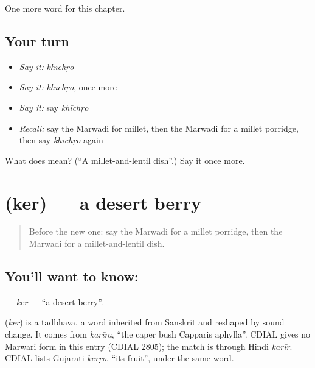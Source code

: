 \begin{grammarlens}[title={What you've built}]
One more word for this chapter.
\end{grammarlens}

\subsection*{Your turn}
\begin{itemize}
\raggedright
  \item \emph{Say it:} \emph{khīchṛo}
  \item \emph{Say it:} \emph{khīchṛo}, once more
  \item \emph{Say it:} say \emph{khīchṛo}
  \item \emph{Recall:} say the Marwadi for millet, then the Marwadi for a millet porridge, then say \emph{khīchṛo} again
\end{itemize}

\begin{tcolorbox}[breakable,colback=teal!4,colframe=teal!35!black,title={Before you move on}]
What does  mean? (\textquotedblleft{}A millet-and-lentil dish\textquotedblright{}.) Say it once more.
\end{tcolorbox}
\section[\texorpdfstring{\mw{केर} (ker)}{केर (ker)}]{ (ker) — a desert berry}

\label{lesson:MW-C131-ker}



\begin{quote}
Before the new one: say the Marwadi for a millet porridge, then the Marwadi for a millet-and-lentil dish.
\end{quote}

\subsection*{You'll want to know: }
\textbf{} — \emph{ker} — \textquotedblleft{}a desert berry\textquotedblright{}.

\begin{cousinweb}
\textbf{} (\emph{ker}) is a tadbhava, a word inherited from Sanskrit and reshaped by sound change. It comes from \emph{karīra}, \textquotedblleft{}the caper bush Capparis aphylla\textquotedblright{}. CDIAL gives no Marwari form in this entry (CDIAL 2805); the match is through Hindi \emph{karīr}. CDIAL lists Gujarati \emph{kerṛo}, \textquotedblleft{}its fruit\textquotedblright{}, under the same word.
\end{cousinweb}

